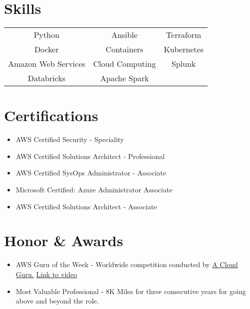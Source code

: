 \documentclass[letterpaper,11pt]{article}
\newcommand{\resumeItemListStart}{\begin{itemize}}
\newcommand{\resumeItemListEnd}{\end{itemize}\vspace{-5pt}}
\begin{document}
\section{Skills}
\setlength{\tabcolsep}{12pt}
\begin{table}[h]

\centering
\begin{tabular}{ccc}
Python              & Ansible         & Terraform  \\
Docker              & Containers      & Kubernetes \\
Amazon Web Services & Cloud Computing & Splunk     \\
Databricks          & Apache Spark    
\end{tabular}
\end{table}



\section{Certifications}
\resumeItemListStart
\item AWS Certified Security - Speciality
\item AWS Certified Solutions Architect - Professional     
\item AWS Certified SysOps Administrator - Associate
\item Microsoft Certified: Azure Administrator Associate
\item AWS Certified Solutions Architect - Associate
\resumeItemListEnd
\section{Honor \& Awards}
\resumeItemListStart
\item AWS Guru of the Week - Worldwide competition conducted by \href{https://acloud.guru}{A Cloud Guru.} \href{https://youtu.be/V1KpO7Z0MnE?t=180}{Link to video}
\item Most Valuable Professional - 8K Miles for three consecutive years for going above and beyond the role.
\resumeItemListEnd

\end{document}
